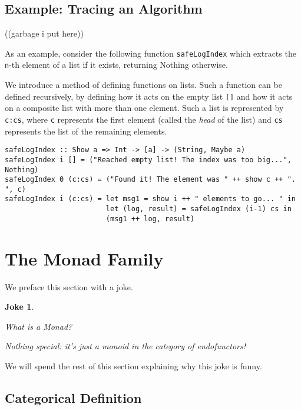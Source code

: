 \documentclass[11pt]{article}
\newtheorem{joke}{Joke}
\theoremstyle{nonumberplain}
\newcommand*\lsin{\lstinline}
\begin{document}
\subsection{Example: Tracing an Algorithm}

((garbage i put here))

As an example, consider the following function \lsin|safeLogIndex| which extracts the \lsin|n|-th element of a list if it exists, returning Nothing otherwise.

We introduce a method of defining functions on lists. Such a function can be defined recursively, by defining how it acts on the empty list \lsin|[]| and how it acts on a composite list with more than one element. Such a list is represented by \lsin|c:cs|, where \lsin|c| represents the first element (called the \emph{head} of the list) and \lsin|cs| represents the list of the remaining elements.
\begin{lstlisting}
safeLogIndex :: Show a => Int -> [a] -> (String, Maybe a)
safeLogIndex i [] = ("Reached empty list! The index was too big...", Nothing)
safeLogIndex 0 (c:cs) = ("Found it! The element was " ++ show c ++ ". ", c)
safeLogIndex i (c:cs) = let msg1 = show i ++ " elements to go... " in
                        let (log, result) = safeLogIndex (i-1) cs in
                        (msg1 ++ log, result)
\end{lstlisting}


\section{The Monad Family}

We preface this section with a joke.

\begin{joke}
\leavevmode
\begin{description}[labelindent=\parindent]
\item[Novice learning Haskell:] What is a Monad?

\item[Haskell expert:] Nothing special: it's just a monoid in the category of endofunctors!
\end{description}
\end{joke}

We will spend the rest of this section explaining why this joke is funny.

\subsection{Categorical Definition}
\end{document}
